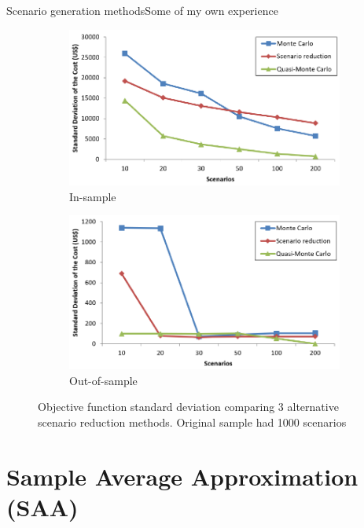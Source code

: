 \begin{frame}{Scenario generation methods}{Some of my own experience}

	
	\begin{figure}
		\begin{subfigure}{0.45\textwidth}
			\includegraphics[width=1.05\textwidth]{figures/stdev_cost_in.pdf}
			\caption{In-sample}
		\end{subfigure}
		\hfill
		\begin{subfigure}{0.45\textwidth}
			\includegraphics[width=1.05\textwidth]{figures/stdev_cost_out.pdf}
			\caption{Out-of-sample}
		\end{subfigure}
		\caption{Objective function standard deviation comparing 3 alternative scenario reduction methods. Original sample had 1000 scenarios \cite{fernandez2018optimizing}}	
	\end{figure}



	
\end{frame}



\section{Sample Average Approximation (SAA)}

